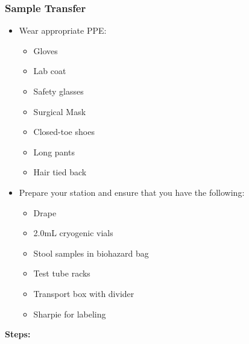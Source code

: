 \documentclass[]{book}
\providecommand{\tightlist}{%
  \setlength{\itemsep}{0pt}\setlength{\parskip}{0pt}}
\begin{document}
\hypertarget{sample-transfer}{%
\subsubsection{Sample Transfer}\label{sample-transfer}}

\begin{itemize}
\tightlist
\item
  Wear appropriate PPE:

  \begin{itemize}
  \tightlist
  \item
    Gloves
  \item
    Lab coat
  \item
    Safety glasses
  \item
    Surgical Mask
  \item
    Closed-toe shoes
  \item
    Long pants
  \item
    Hair tied back
  \end{itemize}
\item
  Prepare your station and ensure that you have the following:

  \begin{itemize}
  \tightlist
  \item
    Drape
  \item
    2.0mL cryogenic vials
  \item
    Stool samples in biohazard bag
  \item
    Test tube racks
  \item
    Transport box with divider
  \item
    Sharpie for labeling
  \end{itemize}
\end{itemize}

\textbf{Steps:}
\end{document}
